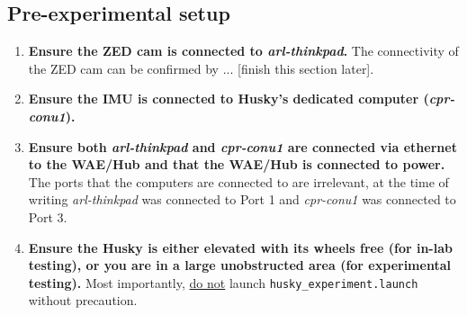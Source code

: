 \documentclass[
	12pt, %
]{fphw}
\newcommand{\code}[1]{\colorbox{light-gray}{\texttt{#1}}}
\begin{document}
\subsection{Pre-experimental setup}
\begin{enumerate}
\item \textbf{Ensure the ZED cam is connected to \emph{arl-thinkpad}.} The connectivity of the ZED cam can be confirmed by ... [finish this section later].

\item \textbf{Ensure the IMU is connected to Husky's dedicated computer (\emph{cpr-conu1}).}

\item \textbf{Ensure both \emph{arl-thinkpad} and \emph{cpr-conu1} are connected via ethernet to the WAE/Hub and that the WAE/Hub is connected to power.} The ports that the computers are connected to are irrelevant, at the time of writing \emph{arl-thinkpad} was connected to Port 1 and \emph{cpr-conu1} was connected to Port 3.

\item \textbf{Ensure the Husky is either elevated with its wheels free (for in-lab testing), or you are in a large unobstructed area (for experimental testing).} Most importantly, \underline{do not} launch \code{husky\_experiment.launch} without precaution.
  
\end{enumerate}
  
\end{document}
